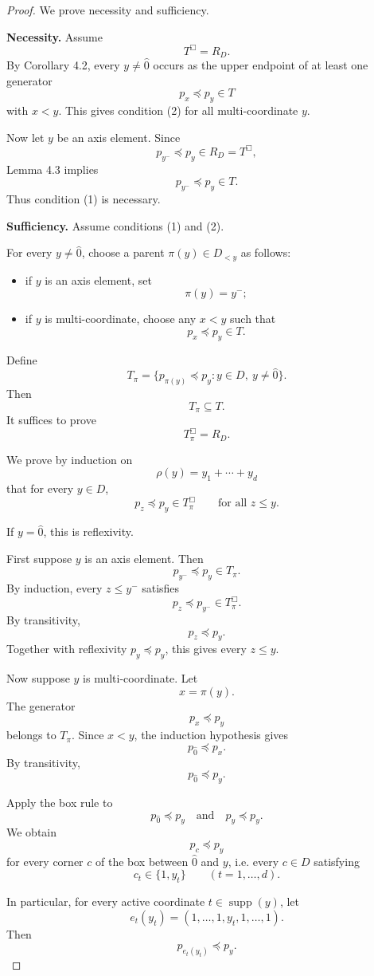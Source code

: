 \documentclass[11pt]{article}
\begin{document}
\begin{proof}
We prove necessity and sufficiency.

\noindent\textbf{Necessity.}
Assume
\[
T^\Box=R_D.
\]
By Corollary 4.2, every $y\ne\hat{0}$ occurs as the upper endpoint of at least one generator
\[
p_x\preceq p_y\in T
\]
with $x<y$. This gives condition (2) for all multi-coordinate $y$.

Now let $y$ be an axis element. Since
\[
p_{y^-}\preceq p_y\in R_D=T^\Box,
\]
Lemma 4.3 implies
\[
p_{y^-}\preceq p_y\in T.
\]
Thus condition (1) is necessary.

\noindent\textbf{Sufficiency.}
Assume conditions (1) and (2).

For every $y\ne\hat{0}$, choose a parent $\pi(y)\in D_{<y}$ as follows:
\begin{itemize}
\item if $y$ is an axis element, set
\[
\pi(y)=y^-;
\]
\item if $y$ is multi-coordinate, choose any $x<y$ such that
\[
p_x\preceq p_y\in T.
\]
\end{itemize}
Define
\[
T_\pi=\{p_{\pi(y)}\preceq p_y:y\in D,\ y\ne\hat{0}\}.
\]
Then
\[
T_\pi\subseteq T.
\]
It suffices to prove
\[
T_\pi^\Box=R_D.
\]

We prove by induction on
\[
\rho(y)=y_1+\cdots+y_d
\]
that for every $y\in D$,
\[
p_z\preceq p_y\in T_\pi^\Box
\qquad
\text{for all }z\le y.
\]

If $y=\hat{0}$, this is reflexivity.

First suppose $y$ is an axis element. Then
\[
p_{y^-}\preceq p_y\in T_\pi.
\]
By induction, every $z\le y^-$ satisfies
\[
p_z\preceq p_{y^-}\in T_\pi^\Box.
\]
By transitivity,
\[
p_z\preceq p_y.
\]
Together with reflexivity $p_y\preceq p_y$, this gives every $z\le y$.

Now suppose $y$ is multi-coordinate. Let
\[
x=\pi(y).
\]
The generator
\[
p_x\preceq p_y
\]
belongs to $T_\pi$. Since $x<y$, the induction hypothesis gives
\[
p_{\hat{0}}\preceq p_x.
\]
By transitivity,
\[
p_{\hat{0}}\preceq p_y.
\]

Apply the box rule to
\[
p_{\hat{0}}\preceq p_y
\quad\text{and}\quad
p_y\preceq p_y.
\]
We obtain
\[
p_c\preceq p_y
\]
for every corner $c$ of the box between $\hat{0}$ and $y$, i.e. every $c\in D$ satisfying
\[
c_t\in\{1,y_t\}
\qquad(t=1,\dots,d).
\]

In particular, for every active coordinate $t\in\operatorname{supp}(y)$, let
\[
e_t(y_t)=(1,\dots,1,y_t,1,\dots,1).
\]
Then
\[
p_{e_t(y_t)}\preceq p_y.
\]


\end{proof}
\end{document}
